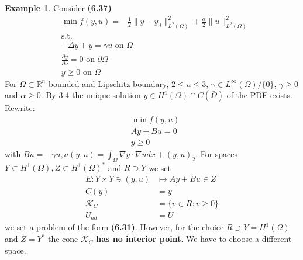 \documentclass[a4paper,11pt,fleqn]{book}
\theoremstyle{definition}
\newtheorem*{example}{Example}
\theoremstyle{remark}
\begin{document}
\begin{example}
Consider \textbf{(6.37)}
\begin{align*}
	&\min f(y, u) =  - \frac{1}{2} \|y - y_d\|_{L^2(\Omega)}^2 + \frac{\alpha}{2}\|u\|^2_{L^2(\Omega)}\\
	&\text{s.t.} \\
	& -\Delta y + y = \gamma u \text{ on } \Omega\\
	& \frac{\partial y}{\partial \nu} = 0 \text{ on } \partial \Omega\\
	& y \ge 0 \text{ on } \Omega 
\end{align*}	
For $\Omega \subset \mathbb{R}^n$ bounded and Lipschitz boundary, $2 \le u \le 3$, $\gamma \in L^\infty(\Omega)\slash \{0\}$, $\gamma \geq 0$ and $\alpha \geq 0$. By 3.4 the unique solution $y \in H^1(\Omega) \cap C(\bar{\Omega})$ of the PDE exists. Rewrite:
\begin{align*}
	&\min f(y, u) \\
	&Ay + Bu = 0\\
	 &y \ge 0
\end{align*}
with $Bu = -\gamma u, a(y, u) = \int_\Omega \nabla y \cdot \nabla u dx + (y, u)_2$. 
For spaces $Y \subset H^1(\Omega), Z \subset H^1(\Omega)^*$ and $R \supset Y$ we set
\begin{align*}
	E: Y \times Y \ni (y, u) &\mapsto Ay + Bu \in Z\\
	C(y) &= y\\
	\mathcal{K}_C &= \{v \in R: v \geq 0\}\\
	U_{ad} &= U
\end{align*}
we set a problem of the form \textbf{(6.31)}. However, for the choice $R \supset Y = H^1(\Omega)$ and $Z = Y^*$ the cone $\mathcal{K}_C$ \textbf{has no interior point}. We have to choose a different space.



\end{example}
\end{document}
